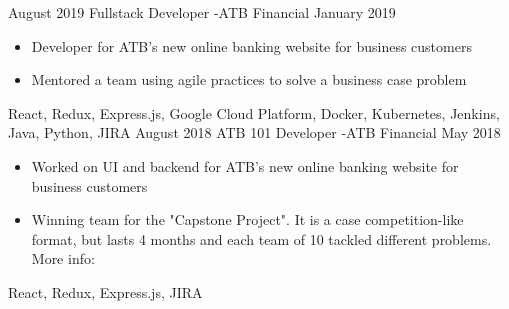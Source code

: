 
\begin{experiences}
  \experience
    {August 2019}   {Fullstack Developer -}{ATB Financial}{}
    {January 2019} {
                      \begin{itemize}
                        \item Developer for ATB's new online banking website for business customers
                        \item Mentored a team using agile practices to solve a business case problem
                      \end{itemize}
                    }
                    {
                        React,
                        Redux,
                        Express.js,
                        Google Cloud Platform,
                        Docker,
                        Kubernetes,
                        Jenkins,
                        Java,
                        Python,
                        JIRA
                    }
  \emptySeparator
  \experience
  {August 2018}   {ATB 101 Developer -}{ATB Financial}{}
  {May 2018} {
                    \begin{itemize}
                      \item Worked on UI and backend for ATB's new online banking website for business customers
                      \item Winning team for the "Capstone Project". It is a case competition-like format,
                      but lasts 4 months and each team of 10 tackled different problems.
                      More info: 
                    \end{itemize}
                  }
                  {
                      React,
                      Redux,
                      Express.js,
                      JIRA
                  }
\end{experiences}
